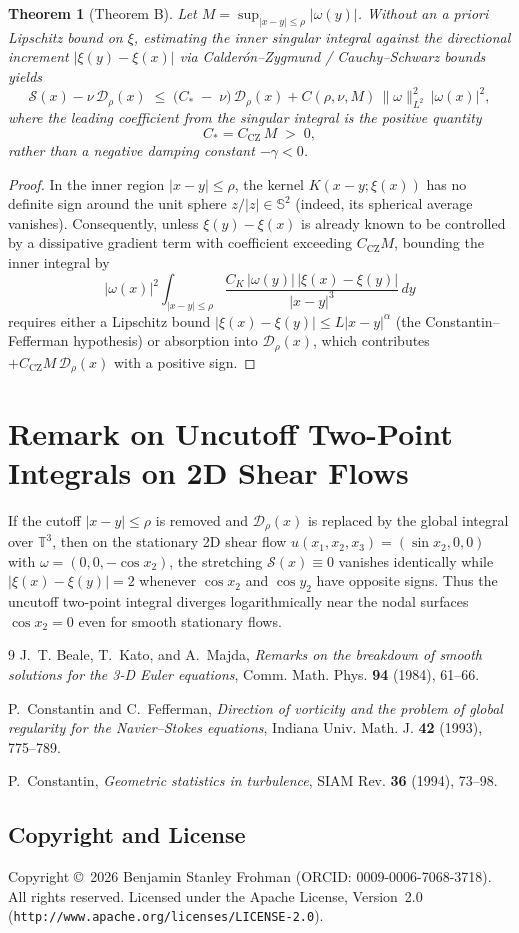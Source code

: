 \documentclass[11pt]{amsart}
\newtheorem{theorem}{Theorem}
\theoremstyle{definition}
\begin{document}
\begin{theorem}[Theorem B]\label{thm:B}
Let $M=\sup_{|x-y|\le\rho}|\omega(y)|$. Without an \emph{a priori} Lipschitz bound on $\xi$, estimating the inner singular integral against the directional increment $|\xi(y)-\xi(x)|$ via Calder\'on--Zygmund / Cauchy--Schwarz bounds yields
\begin{equation}\label{eq:CZ-sign}
  \mathcal{S}(x)-\nu\,\mathcal{D}_\rho(x)
  \;\le\;\bigl(C_*\;-\;\nu\bigr)\,\mathcal{D}_\rho(x) + C(\rho,\nu,M)\,\|\omega\|_{L^2}^2\,|\omega(x)|^2,
\end{equation}
where the leading coefficient from the singular integral is the positive quantity
\[
  C_* = C_{\mathrm{CZ}}\,M \;>\; 0,
\]
rather than a negative damping constant $-\gamma<0$.
\end{theorem}

\begin{proof}
In the inner region $|x-y|\le\rho$, the kernel $K(x-y;\xi(x))$ has no definite sign around the unit sphere $z/|z|\in\mathbb{S}^2$ (indeed, its spherical average vanishes). Consequently, unless $\xi(y)-\xi(x)$ is already known to be controlled by a dissipative gradient term with coefficient exceeding $C_{\mathrm{CZ}}M$, bounding the inner integral by
\[
  |\omega(x)|^2\int_{|x-y|\le\rho}\frac{C_K\,|\omega(y)|\,|\xi(x)-\xi(y)|}{|x-y|^3}\,dy
\]
requires either a Lipschitz bound $|\xi(x)-\xi(y)|\le L|x-y|^\alpha$ (the Constantin--Fefferman hypothesis) or absorption into $\mathcal{D}_\rho(x)$, which contributes $+C_{\mathrm{CZ}}M\,\mathcal{D}_\rho(x)$ with a positive sign.
\end{proof}

\section{Remark on Uncutoff Two-Point Integrals on 2D Shear Flows}

If the cutoff $|x-y|\le\rho$ is removed and $\mathcal{D}_\rho(x)$ is replaced by the global integral over $\mathbb{T}^3$, then on the stationary 2D shear flow $u(x_1,x_2,x_3)=(\sin x_2,0,0)$ with $\omega=(0,0,-\cos x_2)$, the stretching $\mathcal{S}(x)\equiv 0$ vanishes identically while $|\xi(x)-\xi(y)|=2$ whenever $\cos x_2$ and $\cos y_2$ have opposite signs. Thus the uncutoff two-point integral diverges logarithmically near the nodal surfaces $\cos x_2=0$ even for smooth stationary flows.

\begin{thebibliography}{9}
J.~T. Beale, T.~Kato, and A.~Majda, \emph{Remarks on the breakdown of smooth solutions for the 3-D Euler equations}, Comm. Math. Phys. \textbf{94} (1984), 61--66.

P.~Constantin and C.~Fefferman, \emph{Direction of vorticity and the problem of global regularity for the Navier--Stokes equations}, Indiana Univ. Math. J. \textbf{42} (1993), 775--789.

P.~Constantin, \emph{Geometric statistics in turbulence}, SIAM Rev. \textbf{36} (1994), 73--98.
\end{thebibliography}

\subsection*{Copyright and License}
Copyright \copyright\ 2026 Benjamin Stanley Frohman (ORCID: 0009-0006-7068-3718). All rights reserved. Licensed under the Apache License, Version~2.0 (\texttt{http://www.apache.org/licenses/LICENSE-2.0}).
\end{document}
